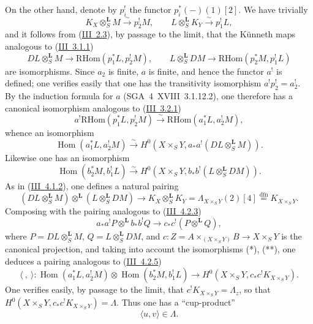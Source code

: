 \documentclass[11pt]{article}
\DeclareMathOperator{\Hom}{Hom}
\providecommand{\RHom}{\mathrm{RHom}}
\providecommand{\LL}{\mathbf L}
\providecommand{\RHom}{\mathrm{RHom}}
\providecommand{\Hom}{\operatorname{Hom}}
\providecommand{\RHom}{\mathrm R\mathcal{H}om}
\providecommand{\RHom}{\mathrm{RHom}}
\providecommand{\Hom}{\operatorname{Hom}}
\begin{document}
On the other hand, denote by $p_i^!$ the functor $p_i^*(-)(1)[2]$. We have trivially
\[
K_X\otimes_S^{\LL}M\xrightarrow{\sim}p_2^!M,
\qquad
L\otimes_S^{\LL}K_Y\xrightarrow{\sim}p_1^!L,
\]
and it follows from (\hyperref[sga5:III:proposition:2.3]{III~2.3}), by passage to the limit, that the Künneth maps analogous to (\hyperref[sga5:III:equation:3.1.1]{III~3.1.1})
\[
DL\otimes_S^{\LL}M\longrightarrow \RHom(p_1^*L,p_2^!M),
\qquad
L\otimes_S^{\LL}DM\longrightarrow \RHom(p_2^*M,p_1^!L)
\]
are isomorphisms. Since $a_2$ is finite, $a$ is finite, and hence the functor $a^!$ is defined; one verifies easily that one has the transitivity isomorphism $a^!p_2^!=a_2^!$. By the induction formula for $a$ (SGA~4~XVIII~3.1.12.2), one therefore has a canonical isomorphism analogous to (\hyperref[sga5:III:equation:3.2.1]{III~3.2.1})
\[
a^!\RHom(p_1^*L,p_2^!M)\xrightarrow{\sim}\RHom(a_1^*L,a_2^!M),
\]
whence an isomorphism
\begin{equation}\tag{*}\label{sga5:IIIB:equation:unnumbered}
\Hom(a_1^*L,a_2^!M)\xrightarrow{\sim}H^0(X\times_S Y,a_*a^!(DL\otimes_S^{\LL}M)).
\end{equation}
Likewise one has an isomorphism
\begin{equation}\tag{**}\label{sga5:IIIB:equation:unnumbered:2}
\Hom(b_2^*M,b_1^!L)\xrightarrow{\sim}H^0(X\times_S Y,b_*b^!(L\otimes_S^{\LL}DM)).
\end{equation}
As in (\hyperref[sga5:III:equation:4.1.2]{III~4.1.2}), one defines a natural pairing
\[
(DL\otimes_S^{\LL}M)\otimes^{\LL}(L\otimes_S^{\LL}DM)
\longrightarrow K_X\otimes_S^{\LL}K_Y=\Lambda_{X\times_S Y}(2)[4]\stackrel{\mathrm{dfn}}{=}K_{X\times_S Y}.
\]
Composing with the pairing analogous to (\hyperref[sga5:III:equation:4.2.3]{III~4.2.3})
\[
a_*a^!P\otimes^{\LL} b_*b^!Q\longrightarrow c_*c^!(P\otimes^{\LL}Q),
\]
where $P=DL\otimes_S^{\LL}M$, $Q=L\otimes_S^{\LL}DM$, and $c:Z=A\times_{(X\times_S Y)}B\to X\times_S Y$ is the canonical projection, and taking into account the isomorphisms (*), (**), one deduces a pairing analogous to (\hyperref[sga5:III:equation:4.2.5]{III~4.2.5})
\[
\langle\ ,\ \rangle:\Hom(a_1^*L,a_2^!M)\otimes\Hom(b_2^*M,b_1^!L)
\longrightarrow H^0(X\times_S Y,c_*c^!K_{X\times_S Y}).
\]
One verifies easily, by passage to the limit, that $c^!K_{X\times_S Y}=\Lambda_z$, so that $H^0(X\times_S Y,c_*c^!K_{X\times_S Y})=\Lambda$. Thus one has a ``cup-product''
\begin{equation}\tag{1.1.2}\label{sga5:IIIB:equation:1.1.2}
\langle u,v\rangle\in\Lambda.
\end{equation}
\end{document}
